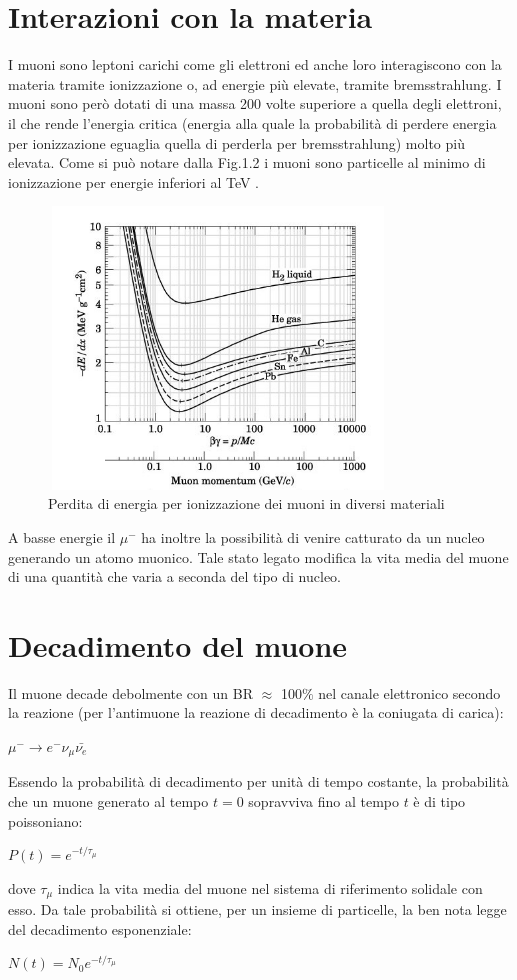 \documentclass{standalone}
\begin{document}
\section{Interazioni con la materia}
I muoni sono leptoni carichi come gli elettroni ed anche loro interagiscono con la materia tramite ionizzazione o, ad energie più elevate, tramite bremsstrahlung.
I muoni sono però dotati di una massa 200 volte superiore a quella degli elettroni, il che rende l'energia critica (energia alla quale la probabilità di perdere energia per ionizzazione eguaglia quella di perderla per bremsstrahlung) molto più elevata.
Come si può notare dalla Fig.1.2 i muoni sono particelle al minimo di ionizzazione per energie inferiori al TeV \cite{Groom}.
\begin{figure}[H]
	\centering
	\includegraphics[width=9cm, height=7.5cm]{images/Energyloss.jpg}
	\caption{Perdita di energia per ionizzazione dei muoni in diversi materiali}
\end{figure}
A basse energie il ${\mu}^-$ ha inoltre la possibilità di venire catturato da un nucleo generando un atomo muonico.
Tale stato legato modifica la vita media del muone di una quantità che varia a seconda del tipo di nucleo.
\section{Decadimento del muone}
Il muone decade debolmente con un BR $\approx$ 100$\%$ nel canale elettronico secondo la reazione (per l'antimuone la reazione di decadimento è la coniugata di carica):\\
\centerline{$\mu^- \rightarrow e^- \nu_\mu \bar{\nu_e}$}
Essendo la probabilità di decadimento per unità di tempo costante, la probabilità che un muone generato al tempo $t=0$ sopravviva fino al tempo $t$ è di tipo poissoniano:\\
\centerline{$P(t)=e^{-t/\tau_\mu}$}
dove $\tau_\mu$ indica la vita media del muone nel sistema di riferimento solidale con esso.
Da tale probabilità si ottiene, per un insieme di particelle, la ben nota legge del decadimento esponenziale: \cite{Bendiscioli} \\
\centerline{$N(t)=N_0e^{-t/\tau_\mu}$}
\end{document}
